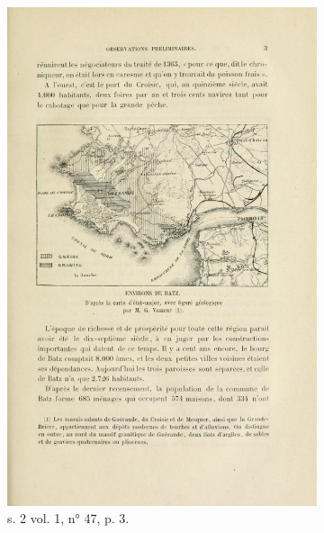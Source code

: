 \begin{figure}
    \begin{subfigure}[t]{0.4\textwidth}
     \includegraphics[width=0.8\linewidth]{img/map_s2t1_m47_p3.png}
     \caption{s. 2 vol. 1, n° 47, p. 3.}
    \end{subfigure}
    \hspace{5pt}
    \begin{subfigure}[t]{0.4\textwidth}

\end{subfigure}
\end{figure}
